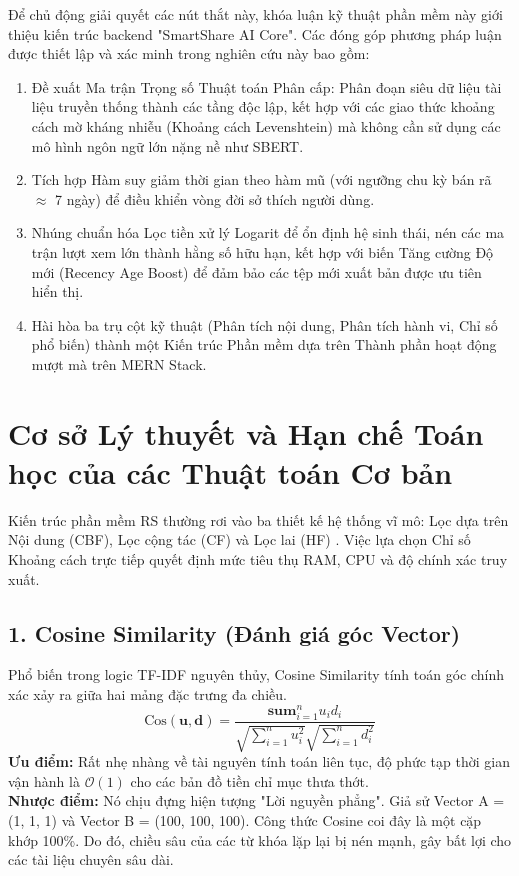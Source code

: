 \documentclass[journal]{IEEEtran}
\begin{document}
Để chủ động giải quyết các nút thắt này, 
khóa luận kỹ thuật phần mềm này giới thiệu kiến trúc backend "SmartShare AI Core". 
Các đóng góp phương pháp luận được thiết lập và xác minh trong nghiên cứu này bao gồm:
\begin{enumerate}
    \item Đề xuất Ma trận Trọng số Thuật toán Phân cấp: Phân đoạn siêu dữ liệu tài liệu truyền thống thành các tầng độc lập, kết hợp với các giao thức khoảng cách mờ kháng nhiễu (Khoảng cách Levenshtein) mà không cần sử dụng các mô hình ngôn ngữ lớn nặng nề như SBERT.
    \item Tích hợp Hàm suy giảm thời gian theo hàm mũ (với ngưỡng chu kỳ bán rã $\approx$ 7 ngày) để điều khiển vòng đời sở thích người dùng.
    \item Nhúng chuẩn hóa Lọc tiền xử lý Logarit để ổn định hệ sinh thái, nén các ma trận lượt xem lớn thành hằng số hữu hạn, kết hợp với biến Tăng cường Độ mới (Recency Age Boost) để đảm bảo các tệp mới xuất bản được ưu tiên hiển thị.
    \item Hài hòa ba trụ cột kỹ thuật (Phân tích nội dung, Phân tích hành vi, Chỉ số phổ biến) thành một Kiến trúc Phần mềm dựa trên Thành phần hoạt động mượt mà trên MERN Stack.
\end{enumerate}

\section{Cơ sở Lý thuyết và Hạn chế Toán học của các Thuật toán Cơ bản}
\label{sec:background}

Kiến trúc phần mềm RS thường rơi vào ba thiết kế hệ thống vĩ mô: 
Lọc dựa trên Nội dung (CBF), Lọc cộng tác (CF) và Lọc lai (HF) \cite{deeplearningrs2019}. 
Việc lựa chọn Chỉ số Khoảng cách trực tiếp quyết định mức tiêu thụ RAM, CPU và độ chính xác truy xuất.

\subsection{1. Cosine Similarity (Đánh giá góc Vector)}

Phổ biến trong logic TF-IDF nguyên thủy, Cosine Similarity tính toán góc chính xác xảy ra giữa hai mảng đặc trưng đa chiều.
\begin{equation}
\label{eq:cosine_baseline}
\text{Cos}(\mathbf{u}, \mathbf{d}) = \frac{\mathbf{sum}_{i=1}^{n} u_i d_i}{\sqrt{\sum_{i=1}^{n} u_i^2}\sqrt{\sum_{i=1}^{n} d_i^2}}
\end{equation}
\textbf{Ưu điểm:} Rất nhẹ nhàng về tài nguyên tính toán liên tục, độ phức tạp thời gian vận hành là $\mathcal{O}(1)$ cho các bản đồ tiền chỉ mục thưa thớt. \\
\textbf{Nhược điểm:} Nó chịu đựng hiện tượng "Lời nguyền phẳng". Giả sử Vector A = (1, 1, 1) và Vector B = (100, 100, 100). Công thức Cosine coi đây là một cặp khớp 100\%. Do đó, chiều sâu của các từ khóa lặp lại bị nén mạnh, gây bất lợi cho các tài liệu chuyên sâu dài.
\end{document}
